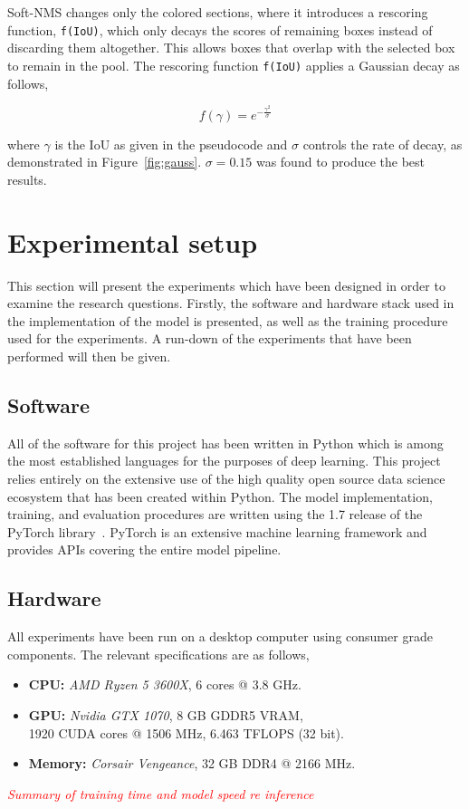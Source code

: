 Soft-NMS changes only the colored sections, where it introduces a rescoring function, \texttt{f(IoU)}, which only decays the scores of remaining boxes instead of discarding them altogether. %
This allows boxes that overlap with the selected box to remain in the pool.
The rescoring function \texttt{f(IoU)} applies a Gaussian decay as follows, %

\[f(\gamma) = e^{-\frac{{\gamma}^2}{\sigma}}\]

where \(\gamma \) is the IoU as given in the pseudocode and \( \sigma \) controls the rate of decay, as demonstrated in Figure~\ref{fig:gauss}. \(\sigma=0.15\) was found to produce the best results.

\section{Experimental setup}\label{sec:method-exp-setup}
This section will present the experiments which have been designed in order to examine the research questions.
Firstly, the software and hardware stack used in the implementation of the model is presented, as well as the training procedure used for the experiments.
A run-down of the experiments that have been performed will then be given.

\subsection{Software}
All of the software for this project has been written in Python which is among the most established languages for the purposes of deep learning.
This project relies entirely on the extensive use of the high quality open source data science ecosystem that has been created within Python.
The model implementation, training, and evaluation procedures are written using the 1.7 release of the PyTorch library\ \parencite{NEURIPS2019_9015}.
PyTorch is an extensive machine learning framework and provides APIs covering the entire model pipeline.

\subsection{Hardware}
All experiments have been run on a desktop computer using consumer grade components.
The relevant specifications are as follows,
\begin{itemize}
  \item \textbf{CPU:} \textit{AMD Ryzen 5 3600X}, 6 cores @ 3.8 GHz.
  \item \textbf{GPU:} \textit{Nvidia GTX 1070}, 8 GB GDDR5 VRAM,\\1920 CUDA cores @ 1506 MHz, 6.463 TFLOPS (32 bit).
  \item \textbf{Memory:} \textit{Corsair Vengeance}, 32 GB DDR4 @ 2166 MHz.
\end{itemize}
{\it
\textcolor{red}{Summary of training time and model speed re inference}
}
